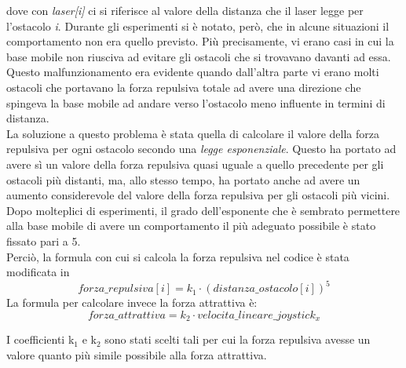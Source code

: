 dove con \textit{laser[i]} ci si riferisce al valore della distanza che il laser legge per l’ostacolo \textit{i}. Durante gli esperimenti si è notato, però, che in alcune situazioni il comportamento non era quello previsto. Più precisamente, vi erano casi in cui la base mobile non riusciva ad evitare gli ostacoli che si trovavano davanti ad essa. Questo malfunzionamento era evidente quando dall'altra parte vi erano molti ostacoli che portavano la forza repulsiva totale ad avere una direzione che spingeva la base mobile ad andare verso l'ostacolo meno influente in termini di distanza.\\
La soluzione a questo problema è stata quella di calcolare il valore della forza repulsiva per ogni ostacolo secondo una \textit{legge esponenziale}. Questo ha portato ad avere sì un valore della forza repulsiva quasi uguale a quello precedente per gli ostacoli più distanti, ma, allo stesso tempo, ha portato anche ad avere un aumento considerevole del valore della forza repulsiva per gli ostacoli più vicini. Dopo molteplici di esperimenti, il grado dell’esponente che è sembrato permettere alla base mobile di avere un comportamento il più adeguato possibile è stato fissato pari a 5.\\
Perciò, la formula con cui si calcola la forza repulsiva nel codice è stata modificata in
\begin{equation}
	forza\_repulsiva[i] = k_{1} \cdot (distanza\_ostacolo[i])^5
\end{equation}
La formula per calcolare invece la forza attrattiva è:
\begin{equation}
	forza\_attrattiva = k_{2} \cdot velocita\_lineare\_joystick_{x}
\end{equation}

I coefficienti k$ _{1} $ e k$ _{2} $ sono stati scelti tali per cui la forza repulsiva avesse un valore quanto più simile possibile alla forza attrattiva.

